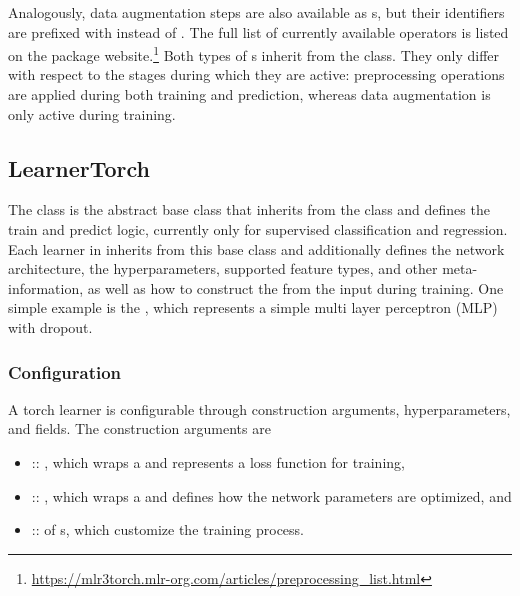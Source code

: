 \documentclass[article]{jss}
\theoremstyle{definition}
\begin{document}
Analogously, data augmentation steps are also available as s, but their identifiers are prefixed with  instead of .
The full list of currently available operators is listed on the package website.\footnote{\url{https://mlr3torch.mlr-org.com/articles/preprocessing\_list.html}}
Both types of s inherit from the  class.
They only differ with respect to the stages during which they are active: preprocessing operations are applied during both training and prediction, whereas data augmentation is only active during training.


\subsection{LearnerTorch}

The   class is the abstract base class that inherits from the  class and defines the train and predict logic, currently only for supervised classification and regression.
Each learner in  inherits from this base class and additionally defines the network architecture, the hyperparameters, supported feature types, and other meta-information, as well as how to construct the  from the input  during training.
One simple example is the , which represents a simple multi layer perceptron (MLP) with dropout.

\subsubsection{Configuration}

A torch learner is configurable through construction arguments, hyperparameters, and fields.
The construction arguments are

\begin{itemize}
    \item {} :: , which wraps a  and represents a loss function for training,
    \item {} :: , which wraps a  and defines how the network parameters are optimized, and
    \item {} ::  of s, which customize the training process.
\end{itemize}
\end{document}
